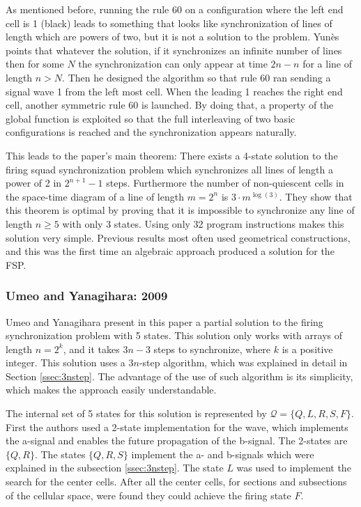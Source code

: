 \documentclass{article}
\begin{document}
As mentioned before, running the rule 60 on a configuration where the left end cell is 1 (black) leads to something that looks like synchronization of lines of length which are powers of two, but it is not a solution to the problem. Yun\`{e}s points that whatever the solution, if it synchronizes an infinite number of lines then for some $N$ the synchronization can only appear at time $2n -n$ for a line of length $n > N$. Then he designed the algorithm so that rule 60 ran sending a signal wave 1 from the left most cell. When the leading 1 reaches the right end cell, another symmetric rule 60 is launched. By doing that, a property of the global function is exploited so that the full interleaving of two basic configurations is reached and the synchronization appears naturally.

This leads to the paper's main theorem: There exists a 4-state solution to the firing squad synchronization problem which synchronizes all lines of length a power of 2 in $2^{n+1}-1$ steps. Furthermore the number of non-quiescent cells in the space-time diagram of a line of length $m = 2^n$ is $3 \cdot m^{\log{(3)}}$. They show that this theorem is optimal by proving that it is impossible to synchronize any line of length $n \ge 5$ with only 3 states. Using only 32 program instructions makes this solution very simple. Previous results most often used geometrical constructions, and this was the first time an algebraic approach produced a solution for the FSP.

\subsubsection{Umeo and Yanagihara: 2009}

Umeo and Yanagihara present in this paper a partial solution to the firing synchronization problem with 5 states\cite{umeo2009small}. This solution only works with arrays of length $n = 2^k$, and it takes $3n - 3$ steps to synchronize, where $k$ is a positive integer. This solution uses a $3n$-step algorithm, which was explained in detail in Section \ref{ssec:3nstep}. The advantage of the use of such algorithm is its simplicity, which makes the approach easily understandable. 

The internal set of 5 states for this solution is represented by $\mathcal{Q} = \{Q,L,R,S,F\}$. First the authors used a 2-state implementation for the wave, which implements the a-signal and enables the future propagation of the b-signal. The 2-states are $\{Q,R\}$. The states $\{Q,R,S\}$ implement the a- and b-signals which were explained in the subsection \ref{ssec:3nstep}. The state $L$ was used to implement the search for the center cells. After all the center cells, for sections and subsections of the cellular space, were found they could achieve the 
firing state $F$.
\end{document}
